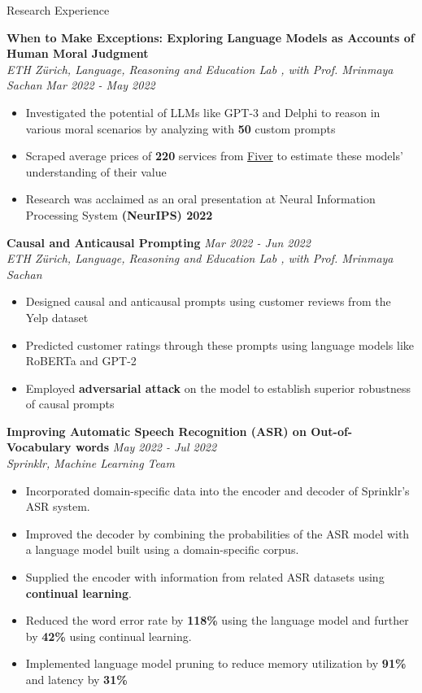 \documentclass[40]{resume} %
\begin{document}
\begin{rSection}{Research Experience}
\vspace{0.2 cm}

{\bf When to Make Exceptions: Exploring Language Models as Accounts of Human Moral Judgment} \hfill { } 
\\ \textit{ETH Zürich, Language, Reasoning and Education Lab
, with Prof. Mrinmaya Sachan} \hfill {\em Mar 2022 - May 2022 }
\begin{itemize}
\item Investigated the potential of LLMs like GPT-3 and Delphi to reason in various moral scenarios by analyzing with \textbf{50} custom prompts
\item Scraped average prices of \textbf{220} services from \href{https://www.fiverr.com/?utm_source=306294&utm_medium=cx_affiliate&utm_campaign=&afp=63975b6bf036a80340a5ecd1&cxd_token=306294_17458287_|afp0:63975b6bf036a80340a5ecd1|afp1:1660_&show_join=true}{Fiver} to estimate these models' understanding of their value
\item Research was acclaimed as an oral presentation at Neural Information Processing System \textbf{(NeurIPS) 2022}
\end{itemize}
\pagebreak


{\bf Causal and Anticausal Prompting} \hfill {\em Mar 2022 - Jun 2022 } 
\\ \textit{ETH Zürich, Language, Reasoning and Education Lab
, with Prof. Mrinmaya Sachan} \hfill { \em }
\begin{itemize}
\item Designed causal and anticausal prompts using customer reviews from the Yelp dataset
\item Predicted customer ratings through these prompts using language models like RoBERTa and GPT-2
\item Employed \textbf{adversarial attack} on the model to establish superior robustness of causal prompts
\end{itemize}


\vspace{0.2cm}
{\bf Improving Automatic Speech Recognition (ASR) on Out-of-Vocabulary words} \hfill { \em May 2022 - Jul 2022} 
\\ \textit{Sprinklr, Machine Learning Team} \hfill { \em }
\begin{itemize}
\item Incorporated domain-specific data into the encoder and decoder of Sprinklr's ASR system.
\item Improved the decoder by combining the probabilities of the ASR model with a language model built using a domain-specific corpus.
\item Supplied the encoder with information from related ASR datasets using \textbf{continual learning}.
\item Reduced the word error rate by \textbf{118\%} using the language model and further by \textbf{42\%} using continual learning.
\item Implemented language model pruning to reduce memory utilization by \textbf{91\%} and latency by \textbf{31\%}
\end{itemize}
\vspace{2pt}
\end{rSection}
\end{document}
